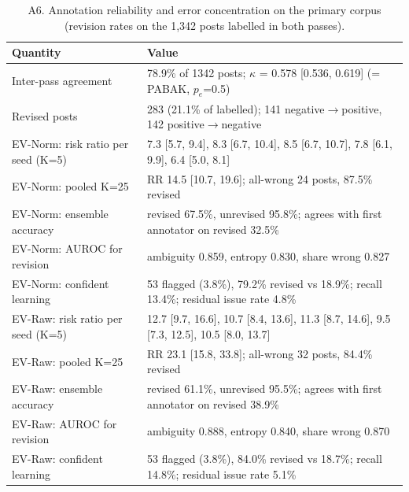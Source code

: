 \begin{table}[!htbp]\centering\scriptsize
\caption*{A6. Annotation reliability and error concentration on the primary corpus (revision rates on the 1,342 posts labelled in both passes).}
\begin{tabular}{lp{11.2cm}}\toprule
Quantity & Value \\ \midrule
Inter-pass agreement & 78.9\% of 1342 posts; $\kappa$ = 0.578 [0.536, 0.619] (= PABAK, $p_e$=0.5) \\
Revised posts & 283 (21.1\% of labelled); 141 negative$\to$positive, 142 positive$\to$negative \\
EV-Norm: risk ratio per seed (K=5) & 7.3 [5.7, 9.4], 8.3 [6.7, 10.4], 8.5 [6.7, 10.7], 7.8 [6.1, 9.9], 6.4 [5.0, 8.1] \\
EV-Norm: pooled K=25 & RR 14.5 [10.7, 19.6]; all-wrong 24 posts, 87.5\% revised \\
EV-Norm: ensemble accuracy & revised 67.5\%, unrevised 95.8\%; agrees with first annotator on revised 32.5\% \\
EV-Norm: AUROC for revision & ambiguity 0.859, entropy 0.830, share wrong 0.827 \\
EV-Norm: confident learning & 53 flagged (3.8\%), 79.2\% revised vs 18.9\%; recall 13.4\%; residual issue rate 4.8\% \\
EV-Raw: risk ratio per seed (K=5) & 12.7 [9.7, 16.6], 10.7 [8.4, 13.6], 11.3 [8.7, 14.6], 9.5 [7.3, 12.5], 10.5 [8.0, 13.7] \\
EV-Raw: pooled K=25 & RR 23.1 [15.8, 33.8]; all-wrong 32 posts, 84.4\% revised \\
EV-Raw: ensemble accuracy & revised 61.1\%, unrevised 95.5\%; agrees with first annotator on revised 38.9\% \\
EV-Raw: AUROC for revision & ambiguity 0.888, entropy 0.840, share wrong 0.870 \\
EV-Raw: confident learning & 53 flagged (3.8\%), 84.0\% revised vs 18.7\%; recall 14.8\%; residual issue rate 5.1\% \\
\bottomrule\end{tabular}\end{table}

